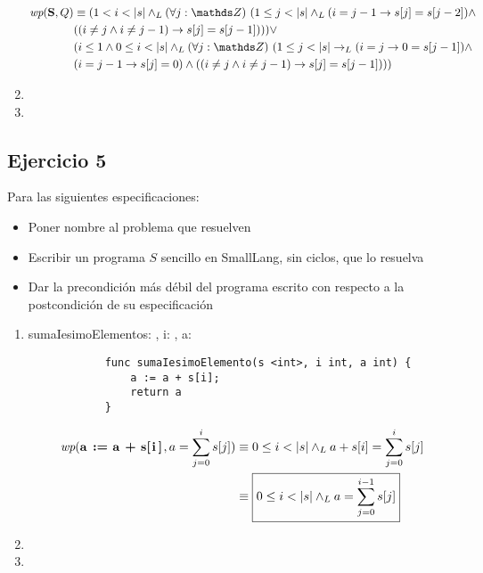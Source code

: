 \begin{enumerate}[label=\alph*)]
          \begin{align*}
              \wp{S}{Q} & \equiv (1 < i < |s| \yLuego \paraTodo{j}{\ent}{1 \leq j < |s| \yLuego (i = j - 1 \Then s[j] = s[j-2]) \land        \\
                        & ((i \neq j \land i \neq j - 1) \Then s[j] = s[j-1])})\lor                                                          \\
                        & (i \leq 1 \land 0 \leq i < |s| \yLuego \paraTodo{j}{\ent}{1 \leq j < |s| \thenLuego (i = j \Then 0 = s[j-1]) \land \\
                        & (i = j-1 \Then s[j] = 0) \land ((i \neq j \land i \neq j-1) \Then s[j] = s[j-1])})
          \end{align*}

    \item \hacer
    \item \hacer
\end{enumerate}

\subsection{Ejercicio 5}
Para las siguientes especificaciones:

\begin{itemize}
    \item Poner nombre al problema que resuelven
    \item Escribir un programa $S$ sencillo en SmallLang, sin ciclos, que lo resuelva
    \item Dar la precondición más débil del programa escrito con respecto a la postcondición de su especificación
\end{itemize}

\begin{enumerate}[label=\alph*)]
    \item \begin{proc}{sumaIesimoElemento}{\In s: \TLista{\ent}, \In i: \ent, \Inout a: \ent}{}
          \end{proc}

          \begin{lstlisting}
            func sumaIesimoElemento(s <int>, i int, a int) {
                a := a + s[i];
                return a
            }
          \end{lstlisting}

          \begin{align*}
              \wp{a := a + s[i]}{a = \sum_{j=0}^{i} s[j]} & \equiv 0 \leq i < |s| \yLuego a + s[i] = \sum_{j=0}^{i} s[j]    \\
                                                          & \equiv \boxed{0 \leq i < |s| \yLuego a = \sum_{j=0}^{i-1} s[j]}
          \end{align*}

    \item \hacer
    \item \hacer
\end{enumerate}


